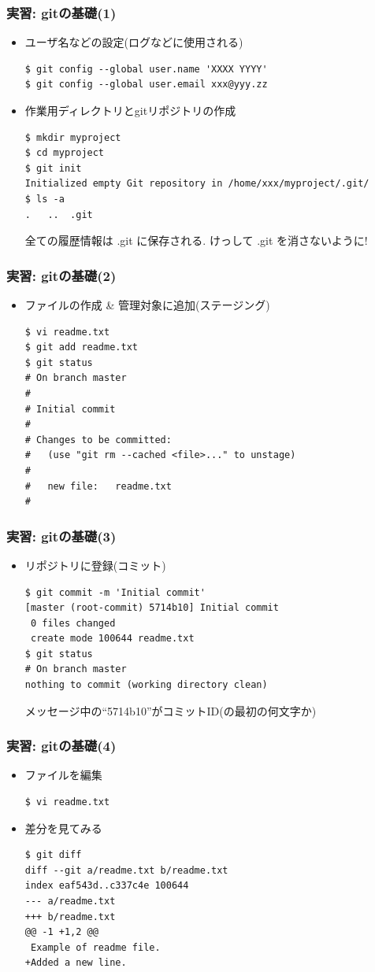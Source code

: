 \begin{frame}[t,fragile]
  \frametitle{実習: gitの基礎(1)}
  \begin{itemize}
  \item ユーザ名などの設定(ログなどに使用される)
\begin{lstlisting}
$ git config --global user.name 'XXXX YYYY'
$ git config --global user.email xxx@yyy.zz
\end{lstlisting}
  \item 作業用ディレクトリとgitリポジトリの作成
\begin{lstlisting}
$ mkdir myproject
$ cd myproject
$ git init
Initialized empty Git repository in /home/xxx/myproject/.git/
$ ls -a
.	..	.git
\end{lstlisting}
  全ての履歴情報は .git に保存される. けっして .git を消さないように!
  \end{itemize}
\end{frame}

\begin{frame}[t,fragile]
  \frametitle{実習: gitの基礎(2)}
  \begin{itemize}
  \item ファイルの作成 \& 管理対象に追加(ステージング)
\begin{lstlisting}
$ vi readme.txt
$ git add readme.txt
$ git status
# On branch master
#
# Initial commit
#
# Changes to be committed:
#   (use "git rm --cached <file>..." to unstage)
#
#	new file:   readme.txt
#
\end{lstlisting}
  \end{itemize}
\end{frame}

\begin{frame}[t,fragile]
  \frametitle{実習: gitの基礎(3)}
  \begin{itemize}
  \item リポジトリに登録(コミット)
\begin{lstlisting}
$ git commit -m 'Initial commit'
[master (root-commit) 5714b10] Initial commit
 0 files changed
 create mode 100644 readme.txt
$ git status
# On branch master
nothing to commit (working directory clean)
\end{lstlisting}
  メッセージ中の``5714b10''がコミットID(の最初の何文字か)
  \end{itemize}
\end{frame}

\begin{frame}[t,fragile]
  \frametitle{実習: gitの基礎(4)}
  \begin{itemize}
  \item ファイルを編集
\begin{lstlisting}
$ vi readme.txt
\end{lstlisting}
  \item 差分を見てみる
\begin{lstlisting}
$ git diff
diff --git a/readme.txt b/readme.txt
index eaf543d..c337c4e 100644
--- a/readme.txt
+++ b/readme.txt
@@ -1 +1,2 @@
 Example of readme file.
+Added a new line.
\end{lstlisting}
  \end{itemize}
\end{frame}

